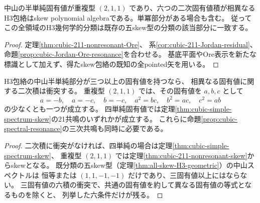 \begin{theorem}
\label{thm:cubic-211-nonresonant-skew}
中山の半単純固有値が重複型 $(2,1,1)$ であり、六つの二次固有値積が相異なる
H3包絡はskew polynomial algebraである。単冪部分がある場合も含む。
従ってこの全領域のH3幾何学的分類は既存の五skew型の分類の該当部分に一致する。
\end{theorem}
\begin{proof}
定理\ref{thm:cubic-211-nonresonant-Ore}、
系\ref{cor:cubic-211-Jordan-residual}、命題\ref{prop:cubic-Jordan-Ore-resonance}を合わせる。
基底平面やOre表示を新たな標識として加えず、得たskew包絡の既知の全pointed矢を用いる。
\end{proof}

\begin{corollary}
\label{cor:cubic-multispectrum-quadratic-resonance}
H3包絡の中山半単純部分が三つ以上の固有値を持つなら、
相異なる固有値に関する二次積は衝突する。
重複型 $(2,1,1)$ では、その固有値を $a,b,c$ として
\[
 a=-b,\quad a=-c,\quad b=-c,\quad
 a^2=bc,\quad b^2=ac,\quad c^2=ab
\]
の少なくとも一つが成立する。
四単純固有値では定理\ref{thm:cubic-simple-spectrum-skew}の21共鳴のいずれかが成立する。
これらに命題\ref{prop:cubic-spectral-resonance}の三次共鳴も同時に必要である。
\end{corollary}
\begin{proof}
二次積に衝突がなければ、四単純の場合は定理\ref{thm:cubic-simple-spectrum-skew}、
重複型 $(2,1,1)$ では定理\ref{thm:cubic-211-nonresonant-skew}からskewとなる。
既分類の五skew型（定理\ref{thm:all-skew-H3-geometric}）の中山スペクトルは
恒等または $(1,1,-1,-1)$ だけであり、三固有値以上にはならない。
三固有値の六積の衝突で、共通の固有値を約して異なる固有値の等式となるものを除くと、
列挙した六条件だけが残る。
\end{proof}

